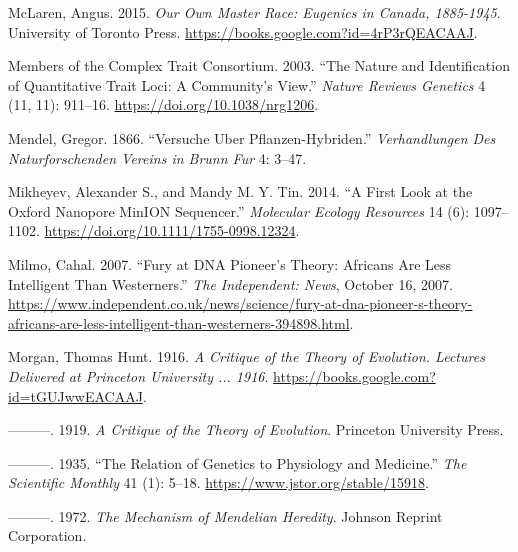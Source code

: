\documentclass[
]{book}
\newlength{\cslhangindent}
\newlength{\cslentryspacingunit} %
\newenvironment{CSLReferences}[2] %
 {%
  \setlength{\parindent}{0pt}
  \ifodd #1
  \let\oldpar\par
  \def\par{\hangindent=\cslhangindent\oldpar}
  \fi
  \setlength{\parskip}{#2\cslentryspacingunit}
 }%
 {}
\begin{document}
\begin{CSLReferences}{1}{0}
\leavevmode{}%
McLaren, Angus. 2015. \emph{Our {Own Master Race}: {Eugenics} in {Canada}, 1885-1945}. {University of Toronto Press}. \url{https://books.google.com?id=4rP3rQEACAAJ}.

\leavevmode{}%
Members of the Complex Trait Consortium. 2003. {``The Nature and Identification of Quantitative Trait Loci: A Community's View.''} \emph{Nature Reviews Genetics} 4 (11, 11): 911--16. \url{https://doi.org/10.1038/nrg1206}.

\leavevmode{}%
Mendel, Gregor. 1866. {``Versuche Uber Pflanzen-Hybriden.''} \emph{Verhandlungen Des Naturforschenden Vereins in Brunn Fur} 4: 3--47.

\leavevmode{}%
Mikheyev, Alexander S., and Mandy M. Y. Tin. 2014. {``A First Look at the {Oxford Nanopore MinION} Sequencer.''} \emph{Molecular Ecology Resources} 14 (6): 1097--1102. \url{https://doi.org/10.1111/1755-0998.12324}.

\leavevmode{}%
Milmo, Cahal. 2007. {``Fury at {DNA} Pioneer's Theory: {Africans} Are Less Intelligent Than {Westerners}.''} \emph{The Independent: News}, October 16, 2007. \url{https://www.independent.co.uk/news/science/fury-at-dna-pioneer-s-theory-africans-are-less-intelligent-than-westerners-394898.html}.

\leavevmode{}%
Morgan, Thomas Hunt. 1916. \emph{A {Critique} of the {Theory} of {Evolution}. {Lectures Delivered} at {Princeton University} ... 1916}. \url{https://books.google.com?id=tGUJwwEACAAJ}.

\leavevmode{}%
---------. 1919. \emph{A {Critique} of the {Theory} of {Evolution}}. {Princeton University Press}.

\leavevmode{}%
---------. 1935. {``The {Relation} of {Genetics} to {Physiology} and {Medicine}.''} \emph{The Scientific Monthly} 41 (1): 5--18. \url{https://www.jstor.org/stable/15918}.

\leavevmode{}%
---------. 1972. \emph{The {Mechanism} of {Mendelian Heredity}}. {Johnson Reprint Corporation}.


\end{CSLReferences}
\end{document}
